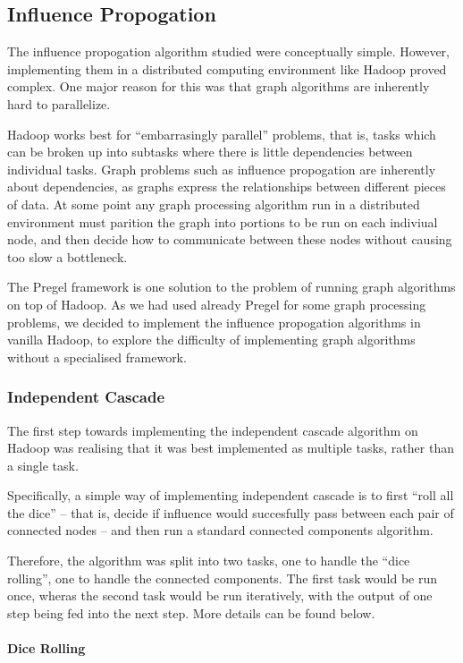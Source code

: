 \subsection{Influence Propogation}

The influence propogation algorithm studied were conceptually simple. However, implementing them in a distributed computing environment like Hadoop proved complex. One major reason for this was that graph algorithms are inherently hard to parallelize. 

Hadoop works best for ``embarrasingly parallel'' problems, that is, tasks which can be broken up into subtasks where there is little dependencies between individual tasks. Graph problems such as influence propogation are inherently about dependencies, as graphs express the relationships between different pieces of data. At some point any graph processing algorithm run in a distributed environment must parition the graph into portions to be run on each indiviual node, and then decide how to communicate between these nodes without causing too slow a bottleneck.

The Pregel framework is one solution to the problem of running graph algorithms on top of Hadoop. As we had used already Pregel for some graph processing problems, we decided to implement the influence propogation algorithms in vanilla Hadoop, to explore the difficulty of implementing graph algorithms without a specialised framework.

\subsubsection{Independent Cascade}

The first step towards implementing the independent cascade algorithm on Hadoop was realising that it was best implemented as multiple tasks, rather than a single task.

Specifically, a simple way of implementing independent cascade is to first ``roll all the dice'' -- that is, decide if influence would succesfully pass between each pair of connected nodes -- and then run a standard connected components algorithm.

Therefore, the algorithm was split into two tasks, one to handle the ``dice rolling'', one to handle the connected components. The first task would be run once, wheras the second task would be run iteratively, with the output of one step being fed into the next step. More details can be found below.

\paragraph{Dice Rolling}

